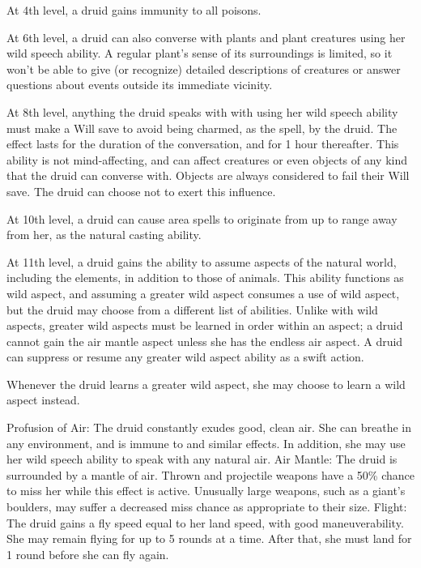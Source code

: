 
 At 4th level, a druid gains immunity to all poisons.

 At 6th level, a druid can also converse with plants and plant creatures using her wild speech ability. A regular plant's sense of its surroundings is limited, so it won't be able to give (or recognize) detailed descriptions of creatures or answer questions about events outside its immediate vicinity.

 At 8th level, anything the druid speaks with with using her wild speech ability must make a Will save to avoid being charmed, as the  spell, by the druid. The effect lasts for the duration of the conversation, and for 1 hour thereafter. This ability is not mind-affecting, and can affect creatures or even objects of any kind that the druid can converse with. Objects are always considered to fail their Will save.  The druid can choose not to exert this influence.

 At 10th level, a druid can cause area spells to originate from up to \rngclose range away from her, as the natural casting ability.

 At 11th level, a druid gains the ability to assume aspects of the natural world, including the elements, in addition to those of animals. This ability functions as wild aspect, and assuming a greater wild aspect consumes a use of wild aspect, but the druid may choose from a different list of abilities. Unlike with wild aspects, greater wild aspects must be learned in order within an aspect; a druid cannot gain the air mantle aspect unless she has the endless air aspect. A druid can suppress or resume any greater wild aspect ability as a swift action.

Whenever the druid learns a greater wild aspect, she may choose to learn a wild aspect instead.
\begin{greaterwildaspect}
\wilditem Profusion of Air: The druid constantly exudes good, clean air. She can breathe in any environment, and is immune to  and similar effects. In addition, she may use her wild speech ability to speak with any natural air.
\wilditem Air Mantle: The druid is surrounded by a mantle of air. Thrown and projectile weapons have a 50\% chance to miss her while this effect is active. Unusually large weapons, such as a giant's boulders, may suffer a decreased miss chance as appropriate to their size.
\wilditemplus Flight: The druid gains a fly speed equal to her land speed, with good maneuverability. She may remain flying for up to 5 rounds at a time. After that, she must land for 1 round before she can fly again.
\end{greaterwildaspect}

